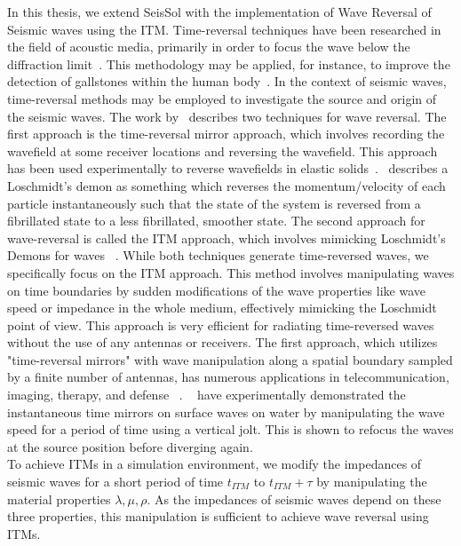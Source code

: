 In this thesis, we extend SeisSol with the implementation of Wave Reversal of Seismic waves using the \acf{ITM}. 
Time-reversal techniques have been researched in the field of acoustic media, primarily in order to focus the wave below
the diffraction limit~\parencite{67072}. This methodology may be applied, for instance, to improve the detection of gallstones within the human body~\parencite{10.1063/1.881692}. 
In the context of seismic waves, time-reversal methods may be employed to investigate the source and origin of the seismic waves.
The work by~\parencite{Fink2017} describes two techniques for wave reversal. The first approach is the time-reversal mirror approach, which involves recording the wavefield at some 
receiver locations and reversing the wavefield. This approach has been used experimentally to reverse wavefields in elastic solids~\parencite{PhysRevLett.100.064301}.~\parencite{Weinert2016} describes a Loschmidt's demon as something which reverses the momentum/velocity of each particle instantaneously such that the state of the system is reversed 
from a fibrillated state to a less fibrillated, smoother state. The second approach for wave-reversal is called the \acf{ITM} approach, which involves
mimicking Loschmidt's Demons for waves ~\parencite{Fink2017}. 
While both techniques generate time-reversed waves, we specifically focus on the \ac{ITM} approach. 
This method involves manipulating waves on time boundaries by sudden modifications of the wave properties like wave speed or impedance in the whole medium, 
effectively mimicking the Loschmidt point of view. 
This approach is very efficient for radiating time-reversed waves without the use of any antennas or receivers. 
The first approach, which utilizes "time-reversal mirrors" with wave manipulation along a spatial boundary sampled by a finite number of antennas, has numerous applications in telecommunication, imaging, therapy, and defense ~\parencite{Fink2017}. 
~\parencite{Bacot2016} have experimentally demonstrated the instantaneous time mirrors on surface waves on water by manipulating the wave speed for a period of time using a vertical jolt.
This is shown to refocus the waves at the source position before diverging again.\\

To achieve \ac{ITM}s in a simulation environment, we modify the impedances of seismic waves for a short period of time $t_{ITM}$ to $t_{ITM} + \tau$ by manipulating 
the material properties $\lambda, \mu, \rho$. As the impedances of seismic waves depend on these three properties, this manipulation is 
sufficient to achieve wave reversal using \ac{ITM}s.

